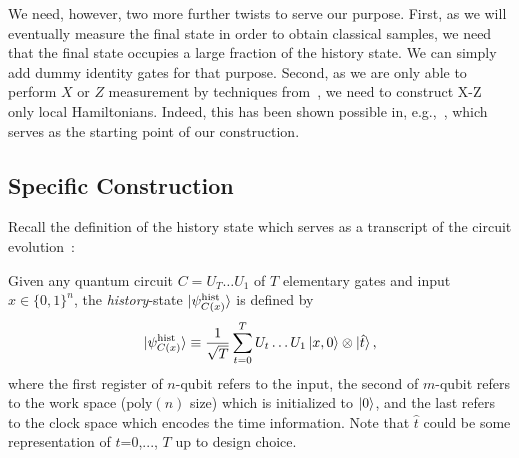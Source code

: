 We need, however, two more further twists to serve our purpose. 
First, as we will eventually measure the final state in order to obtain classical samples, we need that the final state occupies a large fraction of the history state. We can simply add dummy identity gates for that purpose. 
Second, as we are only able to perform $X$ or $Z$ measurement by techniques from~\cite{FOCS:Mahadev18a},
we need to construct X-Z only local Hamiltonians. 
Indeed, this has been shown possible in, e.g.,~\cite{PhysRevA.78.012352}, which serves as the starting point of our construction. 




\subsection{Specific Construction}

Recall the definition of the history state which serves as a transcript of the circuit evolution~\cite{kitaev2002classical}:

\begin{dfn}
	\label{dfn:groundstate}	
    Given any quantum circuit $C=U_T\ldots U_1$ of $T$ elementary gates and input $x\in\{0,1\}^n$, the \emph{history}-state $\ket{\psi_{C(x)}^{\mathrm{hist}}}$ is defined by
    \begin{equation}
        \ket{\psi_{C(x)}^{\mathrm{hist}}} \equiv \frac{1}{\sqrt{T}}\sum_{t=0}^TU_t\ldots U_1\ket{x,0}\otimes\ket{\hat{t}},
    \end{equation}
    where the first register of $n$-qubit refers to the input, the second of $m$-qubit refers to the work space ($\mathrm{poly}(n)$ size) which is initialized to $\ket{0}$, and the last refers to the clock space which encodes the time information. Note that $\hat{t}$ could be some representation of $t$=0,..., $T$ up to design choice. 
\end{dfn}

